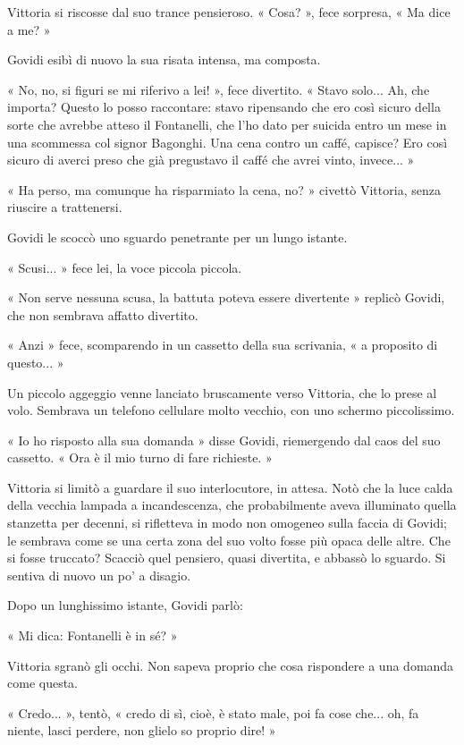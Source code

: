 Vittoria si riscosse dal suo trance pensieroso. « Cosa? », fece sorpresa, « Ma dice a me? »

Govidi esibì di nuovo la sua risata intensa, ma composta.

« No, no, si figuri se mi riferivo a lei! », fece divertito. « Stavo solo... Ah, che importa? Questo lo posso raccontare: stavo ripensando che ero così sicuro della sorte che avrebbe atteso il Fontanelli, che l'ho dato per suicida entro un mese in una scommessa col signor Bagonghi. Una cena contro un caffé, capisce? Ero così sicuro di averci preso che già pregustavo il caffé che avrei vinto, invece... »

« Ha perso, ma comunque ha risparmiato la cena, no? » civettò Vittoria, senza riuscire a trattenersi.

Govidi le scoccò uno sguardo penetrante per un lungo istante.

« Scusi... » fece lei, la voce piccola piccola.

« Non serve nessuna scusa, la battuta poteva essere divertente » replicò Govidi, che non sembrava affatto divertito.

« Anzi » fece, scomparendo in un cassetto della sua scrivania, « a proposito di questo... »

Un piccolo aggeggio venne lanciato bruscamente verso Vittoria, che lo prese al volo. Sembrava un telefono cellulare molto vecchio, con uno schermo piccolissimo.

« Io ho risposto alla sua domanda » disse Govidi, riemergendo dal caos del suo cassetto. « Ora è il mio turno di fare richieste. »

Vittoria si limitò a guardare il suo interlocutore, in attesa. Notò che la luce calda della vecchia lampada a incandescenza, che probabilmente aveva illuminato quella stanzetta per decenni, si rifletteva in modo non omogeneo sulla faccia di Govidi; le sembrava come se una certa zona del suo volto fosse più opaca delle altre. Che si fosse truccato? Scacciò quel pensiero, quasi divertita, e abbassò lo sguardo. Si sentiva di nuovo un po' a disagio. 

Dopo un lunghissimo istante, Govidi parlò:

« Mi dica: Fontanelli è in sé? »

Vittoria sgranò gli occhi. Non sapeva proprio che cosa rispondere a una domanda come questa.

« Credo... », tentò, « credo di sì, cioè, è stato male, poi fa cose che... oh, fa niente, lasci perdere, non glielo so proprio dire! »

